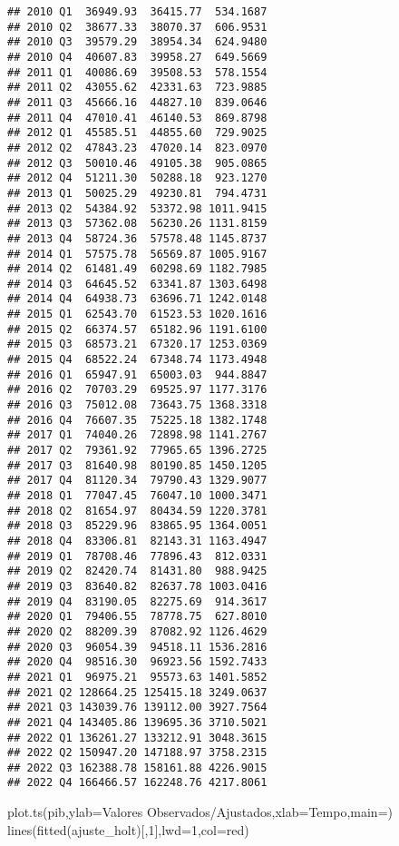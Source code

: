 \documentclass[
]{article}
\newenvironment{Shaded}{\begin{snugshade}}{\end{snugshade}}
\newcommand{\AttributeTok}[1]{\textcolor[rgb]{0.77,0.63,0.00}{#1}}
\newcommand{\DecValTok}[1]{\textcolor[rgb]{0.00,0.00,0.81}{#1}}
\newcommand{\FunctionTok}[1]{\textcolor[rgb]{0.00,0.00,0.00}{#1}}
\newcommand{\NormalTok}[1]{#1}
\newcommand{\StringTok}[1]{\textcolor[rgb]{0.31,0.60,0.02}{#1}}
\begin{document}
\begin{verbatim}
## 2010 Q1  36949.93  36415.77  534.1687
## 2010 Q2  38677.33  38070.37  606.9531
## 2010 Q3  39579.29  38954.34  624.9480
## 2010 Q4  40607.83  39958.27  649.5669
## 2011 Q1  40086.69  39508.53  578.1554
## 2011 Q2  43055.62  42331.63  723.9885
## 2011 Q3  45666.16  44827.10  839.0646
## 2011 Q4  47010.41  46140.53  869.8798
## 2012 Q1  45585.51  44855.60  729.9025
## 2012 Q2  47843.23  47020.14  823.0970
## 2012 Q3  50010.46  49105.38  905.0865
## 2012 Q4  51211.30  50288.18  923.1270
## 2013 Q1  50025.29  49230.81  794.4731
## 2013 Q2  54384.92  53372.98 1011.9415
## 2013 Q3  57362.08  56230.26 1131.8159
## 2013 Q4  58724.36  57578.48 1145.8737
## 2014 Q1  57575.78  56569.87 1005.9167
## 2014 Q2  61481.49  60298.69 1182.7985
## 2014 Q3  64645.52  63341.87 1303.6498
## 2014 Q4  64938.73  63696.71 1242.0148
## 2015 Q1  62543.70  61523.53 1020.1616
## 2015 Q2  66374.57  65182.96 1191.6100
## 2015 Q3  68573.21  67320.17 1253.0369
## 2015 Q4  68522.24  67348.74 1173.4948
## 2016 Q1  65947.91  65003.03  944.8847
## 2016 Q2  70703.29  69525.97 1177.3176
## 2016 Q3  75012.08  73643.75 1368.3318
## 2016 Q4  76607.35  75225.18 1382.1748
## 2017 Q1  74040.26  72898.98 1141.2767
## 2017 Q2  79361.92  77965.65 1396.2725
## 2017 Q3  81640.98  80190.85 1450.1205
## 2017 Q4  81120.34  79790.43 1329.9077
## 2018 Q1  77047.45  76047.10 1000.3471
## 2018 Q2  81654.97  80434.59 1220.3781
## 2018 Q3  85229.96  83865.95 1364.0051
## 2018 Q4  83306.81  82143.31 1163.4947
## 2019 Q1  78708.46  77896.43  812.0331
## 2019 Q2  82420.74  81431.80  988.9425
## 2019 Q3  83640.82  82637.78 1003.0416
## 2019 Q4  83190.05  82275.69  914.3617
## 2020 Q1  79406.55  78778.75  627.8010
## 2020 Q2  88209.39  87082.92 1126.4629
## 2020 Q3  96054.39  94518.11 1536.2816
## 2020 Q4  98516.30  96923.56 1592.7433
## 2021 Q1  96975.21  95573.63 1401.5852
## 2021 Q2 128664.25 125415.18 3249.0637
## 2021 Q3 143039.76 139112.00 3927.7564
## 2021 Q4 143405.86 139695.36 3710.5021
## 2022 Q1 136261.27 133212.91 3048.3615
## 2022 Q2 150947.20 147188.97 3758.2315
## 2022 Q3 162388.78 158161.88 4226.9015
## 2022 Q4 166466.57 162248.76 4217.8061
\end{verbatim}

\begin{Shaded}
\begin{Highlighting}[]
\FunctionTok{plot.ts}\NormalTok{(pib,}\AttributeTok{ylab=}\StringTok{\textquotesingle{}Valores Observados/Ajustados\textquotesingle{}}\NormalTok{,}\AttributeTok{xlab=}\StringTok{\textquotesingle{}Tempo\textquotesingle{}}\NormalTok{,}\AttributeTok{main=}\StringTok{\textquotesingle{}\textquotesingle{}}\NormalTok{)}
\FunctionTok{lines}\NormalTok{(}\FunctionTok{fitted}\NormalTok{(ajuste\_holt)[,}\DecValTok{1}\NormalTok{],}\AttributeTok{lwd=}\DecValTok{1}\NormalTok{,}\AttributeTok{col=}\StringTok{\textquotesingle{}red\textquotesingle{}}\NormalTok{)}
\end{Highlighting}
\end{Shaded}
\end{document}

